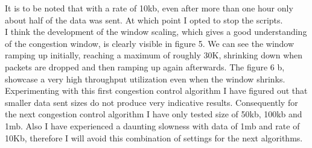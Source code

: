 \documentclass{report}
\begin{document}
It is to be noted that with a rate of 10kb, even after more than one hour only about half of the data was sent. At which point I opted to stop the scripts.\\
I think the development of the window scaling, which gives a good understanding of the congestion window, is clearly visible in figure 5. We can see the window ramping up initially, reaching a maximum of roughly 30K, shrinking down when packets are dropped and then ramping up again afterwards. The figure 6 b, showcase a very high throughput utilization even when the window shrinks.\\
Experimenting with this first congestion control algorithm I have figured out that smaller data sent sizes do not produce very indicative results. Consequently for the next congestion control algorithm I have only tested size of 50kb, 100kb and 1mb. Also I have experienced a daunting slowness with data of 1mb and rate of 10Kb, therefore I will avoid this combination of settings for the next algorithms.
\end{document}
